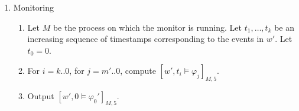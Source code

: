 \documentclass[envcountsame, runningheads]{llncs}
\newcommand{\rednote}[2][]{{\todo[color=magenta!80,size=\footnotesize,#1]{\normalcolor\normalfont#2}}}
\newcommand{\B}{\mathbb{B}}
\newcommand{\?}{\text{?}}
\begin{document}
\begin{enumerate}
		
		\item Monitoring
		\begin{enumerate}[label=\arabic*.]
			\item Let $M$ be the process on which the monitor is running. Let $t_1, \ldots, t_k$ be an increasing sequence of timestamps corresponding to the events in $w'$. Let $t_0 = 0$.
			\item For $i = k .. 0$, for $j = m' .. 0$, compute $[w', t_i \models \varphi_j]_{M,5}$.
			\item Output $[w',0 \models \varphi_0']_{M,5}$.
		\end{enumerate}
	\end{enumerate}
	
\end{document}
